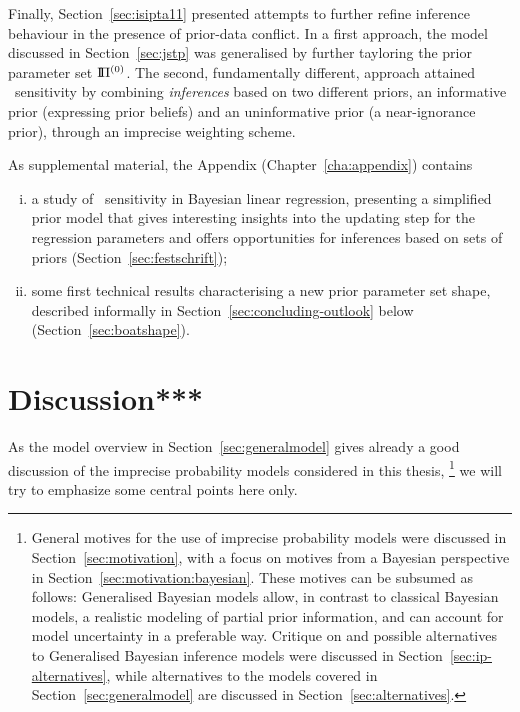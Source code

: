 Finally, Section~\ref{sec:isipta11} presented attempts to further refine
inference behaviour in the presence of prior-data conflict.
In a first approach, the model discussed in Section~\ref{sec:jstp} %
was generalised by further tayloring the prior parameter set $\text{I}\!\Pi^{(0)}$. %
The second, fundamentally different, approach attained \pdc\ sensitivity
by combining \emph{inferences} based on two different priors,
an informative prior (expressing prior beliefs) and an uninformative prior (a near-ignorance prior),
through an imprecise weighting scheme.

As supplemental material, the Appendix (Chapter~\ref{cha:appendix}) contains
\begin{enumerate}[(i)]
\item a study of \pdc\ sensitivity in Bayesian linear regression,
presenting a simplified prior model that gives interesting insights into the updating step
for the regression parameters and offers opportunities for inferences based on sets of priors
(Section~\ref{sec:festschrift});
\item some first technical results characterising a new prior parameter set shape,
described informally in Section~\ref{sec:concluding-outlook} below
(Section~\ref{sec:boatshape}).
\end{enumerate}


\section{Discussion***}
\label{sec:concluding-discussion}


As the model overview in Section~\ref{sec:generalmodel} gives already a good discussion
of the imprecise probability models considered in this thesis,%
\footnote{General motives for the use of imprecise probability models
were discussed in Section~\ref{sec:motivation},
with a focus on motives from a Bayesian perspective in Section~\ref{sec:motivation:bayesian}.
These motives can be subsumed as follows:
Generalised Bayesian models allow, in contrast to classical Bayesian models,
a realistic modeling of partial prior information,
and can account for model uncertainty in a preferable way.
Critique on and possible alternatives to Generalised Bayesian inference models
were discussed in Section~\ref{sec:ip-alternatives},
while alternatives to the models covered in Section~\ref{sec:generalmodel} are discussed in Section~\ref{sec:alternatives}.}
we will try to emphasize some central points here only.

